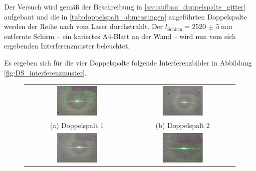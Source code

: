 \documentclass[ngerman]{scrartcl}
\begin{document}
Der Versuch wird gemäß der Beschreibung in \autoref{sec:aufbau_doppelspalte_gitter} aufgebaut und die in \autoref{tab:doppelspalt_abmessungen} angeführten Doppelspalte werden der Reihe nach vom Laser durchstrahlt. Der $l_\text{Schirm} = \SI{2520(5)}{\milli\meter}$ entfernte Schirm -- ein kariertes A4-Blatt an der Wand -- wird nun vom sich ergebenden Interferenzmuster beleuchtet.

Es ergeben sich für die vier Doppelspalte folgende Interferenzbilder in Abbildung \ref{fig:DS_interferenzmuster}.
%

\begin{figure}[htbp]
    \centering
    \begin{tabular}{cc}
        \includegraphics[width=0.4\textwidth]{fig/Compressed/DS1_0_20_25.jpg} &
        \includegraphics[width=0.4\textwidth]{fig/Compressed/DS2_0_10_25.jpg}                     \\
        (a) Doppelspalt 1                                                     & (b) Doppelspalt 2 \\
        \includegraphics[width=0.4\textwidth]{fig/Compressed/DS3_0_10_5.jpg}  &
        \includegraphics[width=0.4\textwidth]{fig/Compressed/DS4_0_11.jpg}                        \\

\end{tabular}
\end{figure}
\end{document}
